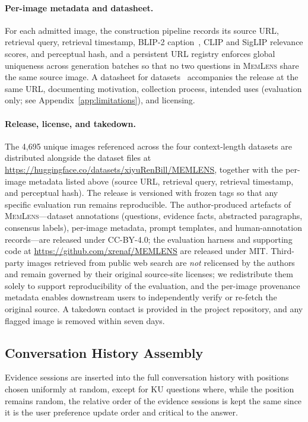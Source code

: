 \documentclass{article}
\newcommand{\bench}{\textsc{MemLens}}
\begin{document}
\paragraph{Per-image metadata and datasheet.}
For each admitted image, the construction pipeline records its source URL, retrieval query, retrieval timestamp, BLIP-2 caption~\cite{li2023blip2}, CLIP and SigLIP relevance scores, and perceptual hash, and a persistent URL registry enforces global uniqueness across generation batches so that no two questions in \bench{} share the same source image. A datasheet for datasets~\citep{gebru2021datasheets} accompanies the release at the same URL, documenting motivation, collection process, intended uses (evaluation only; see Appendix~\ref{app:limitations}), and licensing.

\paragraph{Release, license, and takedown.}
The 4{,}695 unique images referenced across the four context-length datasets are distributed alongside the dataset files at \url{https://huggingface.co/datasets/xiyuRenBill/MEMLENS}, together with the per-image metadata listed above (source URL, retrieval query, retrieval timestamp, and perceptual hash). The release is versioned with frozen tags so that any specific evaluation run remains reproducible. The author-produced artefacts of \bench{}---dataset annotations (questions, evidence facts, abstracted paragraphs, consensus labels), per-image metadata, prompt templates, and human-annotation records---are released under CC-BY-4.0; the evaluation harness and supporting code at \url{https://github.com/xrenaf/MEMLENS} are released under MIT. Third-party images retrieved from public web search are \emph{not} relicensed by the authors and remain governed by their original source-site licenses; we redistribute them solely to support reproducibility of the evaluation, and the per-image provenance metadata enables downstream users to independently verify or re-fetch the original source. A takedown contact is provided in the project repository, and any flagged image is removed within seven days.

\subsection{Conversation History Assembly}
\label{app:history_assembly}

Evidence sessions are inserted into the full conversation history with positions chosen uniformly at random, except for KU questions where, while the position remains random, the relative order of the evidence sessions is kept the same since it is the user preference update order and critical to the answer.
\end{document}

